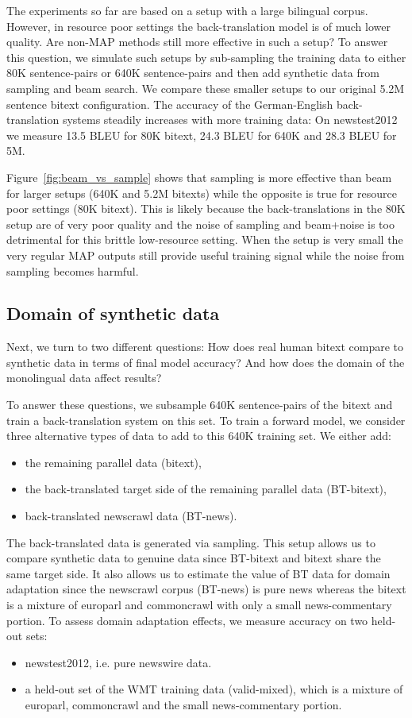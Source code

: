 \documentclass[11pt,a4paper]{article}
\begin{document}
The experiments so far are based on a setup with a large bilingual corpus. 
However, in resource poor settings the back-translation model is of much lower quality. 
Are non-MAP methods still more effective in such a setup?
To answer this question, we simulate such setups by sub-sampling the training data to either 80K sentence-pairs or 640K sentence-pairs and then add synthetic data from sampling and beam search. 
We compare these smaller setups to our original 5.2M sentence bitext configuration.
The accuracy of the German-English back-translation systems steadily increases with more training data: On newstest2012 we measure 13.5 BLEU for 80K bitext, 24.3 BLEU for 640K and 28.3 BLEU for 5M.

Figure~\ref{fig:beam_vs_sample} shows that sampling is more effective than beam for larger setups (640K and 5.2M bitexts) while the opposite is true for resource poor settings (80K bitext).
This is likely because the back-translations in the 80K setup are of very poor quality and the noise of sampling and beam+noise is too detrimental for this brittle low-resource setting.
When the setup is very small the very regular MAP outputs still provide useful training signal while the noise from sampling becomes harmful.




\subsection{Domain of synthetic data}
\label{sec:domain}

Next, we turn to two different questions: 
How does real human bitext compare to synthetic data in terms of final model accuracy? 
And how does the domain of the monolingual data affect results?

To answer these questions, we subsample 640K sentence-pairs of the bitext and train a back-translation system on this set. To train a forward model, we consider three alternative types of data to add to this 640K training set. We either add:
\begin{itemize}
\item the remaining parallel data (bitext),
\item the back-translated target side of the remaining parallel data (BT-bitext),
\item back-translated newscrawl data (BT-news).
\end{itemize}
The back-translated data is generated via sampling. 
This setup allows us to compare synthetic data to genuine data since BT-bitext and bitext share the same target side.
It also allows us to estimate the value of BT data for domain adaptation since the newscrawl corpus (BT-news) is pure news whereas the bitext is a mixture of europarl and commoncrawl with only a small news-commentary portion.
To assess domain adaptation effects, we measure accuracy on two held-out sets:
\begin{itemize}
\item newstest2012, i.e. pure newswire data.
\item a held-out set of the WMT training data (valid-mixed), which is a mixture of europarl, commoncrawl and the small news-commentary portion.
\end{itemize}
\end{document}
